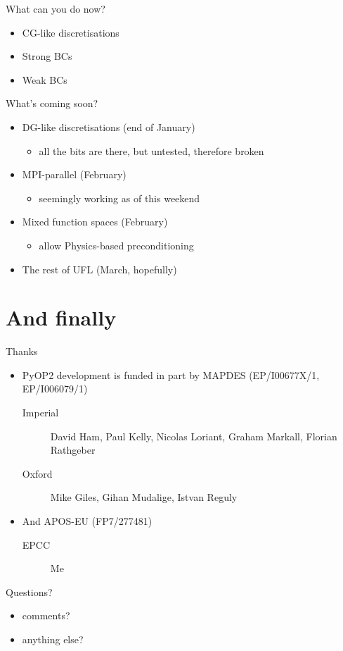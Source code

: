 \documentclass[bigger]{beamer}
\begin{document}
\begin{frame}[label={sec:orgheadline24}]{What can you do now?}
\begin{itemize}
\item CG-like discretisations
\item Strong BCs
\item Weak BCs
\end{itemize}
\end{frame}

\begin{frame}[label={sec:orgheadline25}]{What's coming soon?}
\begin{itemize}
\item DG-like discretisations (end of January)
\begin{itemize}
\item all the bits are there, but untested, therefore broken
\end{itemize}
\item MPI-parallel (February)
\begin{itemize}
\item seemingly working as of this weekend
\end{itemize}
\item Mixed function spaces (February)
\begin{itemize}
\item allow Physics-based preconditioning
\end{itemize}
\item The rest of UFL (March, hopefully)
\end{itemize}
\end{frame}

\section{And finally}
\label{sec:orgheadline29}

\begin{frame}[label={sec:orgheadline27}]{Thanks}
\begin{itemize}
\item PyOP2 development is funded in part by MAPDES (EP/I00677X/1, EP/I006079/1)
\begin{description}
\item[{Imperial}] David Ham, Paul Kelly, Nicolas
Loriant, Graham Markall, Florian Rathgeber
\item[{Oxford}] Mike Giles, Gihan Mudalige, Istvan Reguly
\end{description}
\item And APOS-EU (FP7/277481)
\begin{description}
\item[{EPCC}] Me
\end{description}
\end{itemize}
\end{frame}

\begin{frame}[label={sec:orgheadline28}]{Questions?}
\begin{itemize}
\item comments?
\item anything else?
\end{itemize}
\end{frame}
\end{document}
